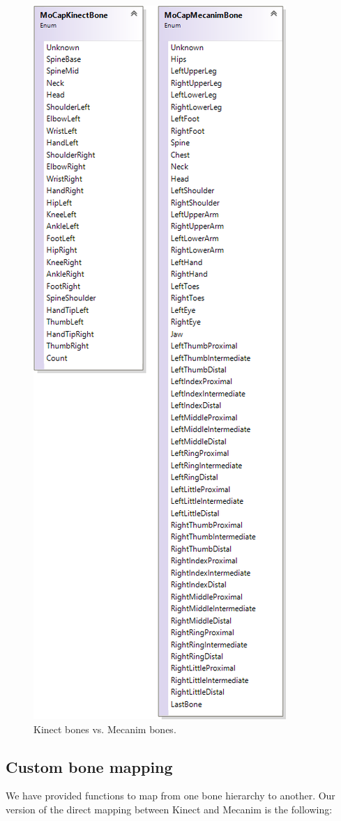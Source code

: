 \documentclass[a4paper, 12pt]{amsart}
\begin{document}
\begin{figure}[htb]
\centering
\includegraphics[width=.575\linewidth]{fig_reflecta_bone_enumerations}
\caption{Kinect bones vs. Mecanim bones.}
\label{fig:reflecta_bone_enumerations}
\end{figure}

\subsection{Custom bone mapping}

We have provided functions to map from one bone hierarchy to another. Our version of the direct mapping between Kinect and Mecanim is the following:
\end{document}
